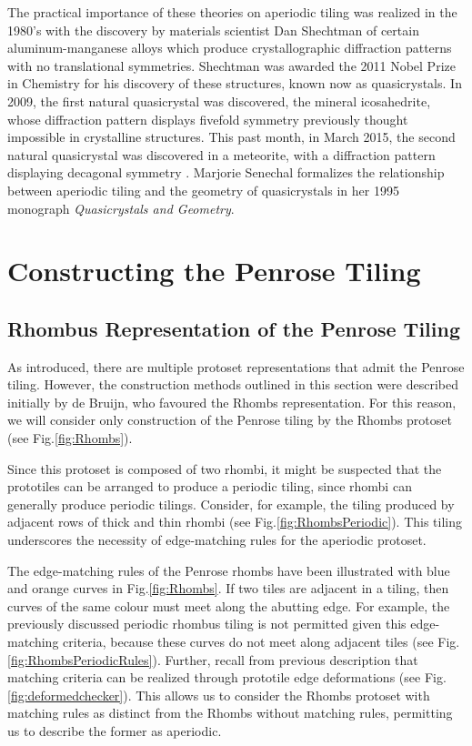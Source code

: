 \documentclass[
  oneside,
  11pt, a4paper,
  footinclude=true,
  headinclude=true,
  cleardoublepage=empty
]{scrbook}
\begin{document}
The practical importance of these theories on aperiodic tiling was realized in the 1980's with the discovery by materials scientist Dan Shechtman of certain aluminum-manganese alloys which produce crystallographic diffraction patterns with no translational symmetries. Shechtman was awarded the 2011 Nobel Prize in Chemistry for his discovery of these structures, known now as quasicrystals. In 2009, the first natural quasicrystal was discovered, the mineral icosahedrite, whose diffraction pattern displays fivefold symmetry previously thought impossible in crystalline structures. This past month, in March 2015, the second natural quasicrystal was discovered in a meteorite, with a diffraction pattern displaying decagonal symmetry \cite{Bindi2015}. Marjorie Senechal formalizes the relationship between aperiodic tiling and the geometry of quasicrystals in her 1995 monograph \textit{Quasicrystals and Geometry}. 


\chapter{Constructing the Penrose Tiling}

\section{Rhombus Representation of the Penrose Tiling}
As introduced, there are multiple protoset representations that admit the Penrose tiling. However, the construction methods outlined in this section were described initially by de Bruijn, who favoured the Rhombs representation.  For this reason, we will consider only construction of the Penrose tiling by the Rhombs protoset (see Fig.\ref{fig:Rhombs}). 

Since this protoset is composed of two rhombi, it might be suspected that the prototiles can be arranged to produce a periodic tiling, since rhombi can generally produce periodic tilings. Consider, for example, the tiling produced by adjacent rows of thick and thin rhombi (see Fig.\ref{fig:RhombsPeriodic}). This tiling underscores the necessity of edge-matching rules for the aperiodic protoset. 

The edge-matching rules of the Penrose rhombs have been illustrated with blue and orange curves in Fig.\ref{fig:Rhombs}. If two tiles are adjacent in a tiling, then curves of the same colour must meet along the abutting edge. For example, the previously discussed periodic rhombus tiling is not permitted given this edge-matching criteria, because these curves do not meet along adjacent tiles (see Fig.\ref{fig:RhombsPeriodicRules}). Further, recall from previous description that matching criteria can be realized through prototile edge deformations (see Fig.\ref{fig:deformedchecker}). This allows us to consider the Rhombs protoset with matching rules as distinct from the Rhombs without matching rules, permitting us to describe the former as aperiodic. 
\end{document}
